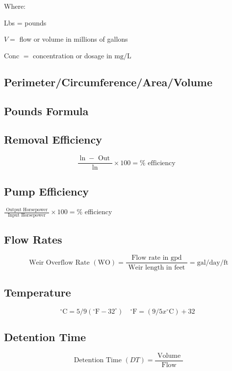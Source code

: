Where:

Lbs = pounds

$V=$ flow or volume in millions of gallons

Conc $=$ concentration or dosage in $\mathrm{mg} / \mathrm{L}$


\subsection{Perimeter/Circumference/Area/Volume}

\subsection{Pounds Formula}

\subsection{Removal Efficiency}
$$
\frac{\ln -\text { Out }}{\ln } \times 100=\% \text { efficiency }
$$

\subsection{Pump Efficiency}
$\frac{\text { Output Horsepower }}{\text { Input Horsepower }} \times 100=\%$ efficiency

\subsection{Flow Rates}
$$
\text { Weir Overflow Rate }(\mathrm{WO})=\frac{\text { Flow rate in gpd }}{\text { Weir length in feet }}=\mathrm{gal} / \mathrm{day} / \mathrm{ft}
$$

\subsection{Temperature}
$$
{ }^{\circ} \mathrm{C}=5 / 9\left({ }^{\circ} \mathrm{F}-32^{\circ}\right) \quad{ }^{\circ} \mathrm{F}=\left(9 / 5 x{ }^{\circ} \mathrm{C}\right)+32
$$

\subsection{Detention Time}
$$
\text { Detention Time }(D T)=\frac{\text { Volume }}{\text { Flow }}
$$

